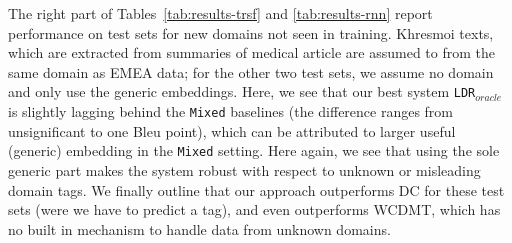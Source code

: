 \documentclass[11pt,a4paper]{article}
\newcommand{\fyTodo}[1]{\Todo[FY:]{\textcolor{orange}{#1}}}
\begin{document}
The right part of Tables~\ref{tab:results-trsf} and \ref{tab:results-rnn} report performance on test sets for new domains not seen in training. Khresmoi texts, which are extracted from summaries of medical article are assumed to from the same domain as EMEA data; for the other two test sets, we assume no domain and only use the generic embeddings. Here, we see that our best system \texttt{LDR}$_{oracle}$ is slightly lagging behind the \texttt{Mixed} baselines (the difference ranges from unsignificant to one Bleu point), which can be attributed to larger useful (generic) embedding in the \texttt{Mixed} setting. Here again, we see that using the sole generic part makes the system robust with respect to unknown or misleading domain tags. We finally outline that our approach outperforms DC for these test sets (were we have to predict a tag)\fyTodo{Fix this}, and even outperforms WCDMT, which has no built in mechanism to handle data from unknown domains.
\end{document}
